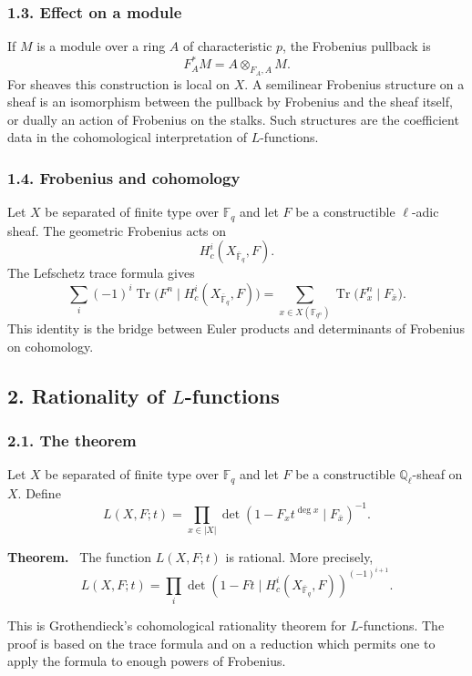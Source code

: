 \documentclass[11pt]{article}
\theoremstyle{plain}
\theoremstyle{definition}
\theoremstyle{remark}
\newenvironment{statement}[1]{\par\medskip\noindent\textbf{#1.}\ }{\par\medskip}
\newcommand{\FF}{\mathbb F}
\newcommand{\QQ}{\mathbb Q}
\begin{document}
\subsubsection*{1.3. Effect on a module}

If $M$ is a module over a ring $A$ of characteristic $p$, the Frobenius pullback is
\[
   F_A^*M=A\otimes_{F_A,A}M.
\]
For sheaves this construction is local on $X$. A semilinear Frobenius structure on a sheaf is an isomorphism between the pullback by Frobenius and the sheaf itself, or dually an action of Frobenius on the stalks. Such structures are the coefficient data in the cohomological interpretation of $L$-functions.

\subsubsection*{1.4. Frobenius and cohomology}

Let $X$ be separated of finite type over $\FF_q$ and let $F$ be a constructible $\ell$-adic sheaf. The geometric Frobenius acts on
\[
   H^i_c(X_{\overline{\FF}_q},F).
\]
The Lefschetz trace formula gives
\[
   \sum_i(-1)^i\operatorname{Tr}\bigl(F^n\mid H^i_c(X_{\overline{\FF}_q},F)\bigr)
     =\sum_{x\in X(\FF_{q^n})}\operatorname{Tr}\bigl(F_x^n\mid F_{\bar x}\bigr).
\]
This identity is the bridge between Euler products and determinants of Frobenius on cohomology.

\subsection*{2. Rationality of $L$-functions}

\subsubsection*{2.1. The theorem}

Let $X$ be separated of finite type over $\FF_q$ and let $F$ be a constructible $\QQ_\ell$-sheaf on $X$. Define
\[
   L(X,F;t)=\prod_{x\in |X|}
      \det(1-F_x t^{\deg x}\mid F_{\bar x})^{-1}.
\]

\begin{statement}{Theorem}
The function $L(X,F;t)$ is rational. More precisely,
\[
   L(X,F;t)=\prod_i
      \det(1-Ft\mid H^i_c(X_{\overline{\FF}_q},F))^{(-1)^{i+1}}.
\]
\end{statement}

This is Grothendieck's cohomological rationality theorem for $L$-functions. The proof is based on the trace formula and on a reduction which permits one to apply the formula to enough powers of Frobenius.
\end{document}
